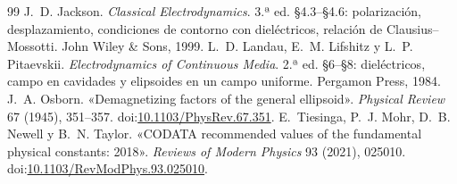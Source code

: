 \begin{thebibliography}{99}
 J.~D. Jackson. \emph{Classical Electrodynamics}. 3.ª ed. §4.3--§4.6: polarización, desplazamiento, condiciones de contorno con
  dieléctricos, relación de Clausius--Mossotti. John Wiley \& Sons, 1999.
 L.~D. Landau, E.~M. Lifshitz y L.~P. Pitaevskii. \emph{Electrodynamics of Continuous Media}. 2.ª ed. §6--§8: dieléctricos, campo en
  cavidades y elipsoides en un campo uniforme. Pergamon Press, 1984.
 J.~A. Osborn. «Demagnetizing factors of the general ellipsoid». \emph{Physical Review} 67 (1945), 351--357.
  doi:\href{https://doi.org/10.1103/PhysRev.67.351}{10.1103/PhysRev.67.351}.
 E.~Tiesinga, P.~J. Mohr, D.~B. Newell y B.~N. Taylor. «CODATA recommended values of the fundamental physical constants: 2018».
  \emph{Reviews of Modern Physics} 93 (2021), 025010. doi:\href{https://doi.org/10.1103/RevModPhys.93.025010}{10.1103/RevModPhys.93.025010}.
\end{thebibliography}
